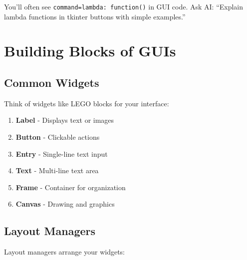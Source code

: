 \documentclass[
  letterpaper,
  DIV=11,
  numbers=noendperiod,
  oneside]{scrreprt}
\providecommand{\tightlist}{%
  \setlength{\itemsep}{0pt}\setlength{\parskip}{0pt}}\usepackage{longtable,booktabs,array}
\begin{document}
\begin{tcolorbox}[enhanced jigsaw, opacityback=0, colback=white, colframe=quarto-callout-warning-color-frame, breakable, titlerule=0mm, coltitle=black, rightrule=.15mm, colbacktitle=quarto-callout-warning-color!10!white, left=2mm, bottomtitle=1mm, bottomrule=.15mm, title=\textcolor{quarto-callout-warning-color}{\faExclamationTriangle}\hspace{0.5em}{Expression Explorer: Lambda Functions}, opacitybacktitle=0.6, toptitle=1mm, leftrule=.75mm, arc=.35mm, toprule=.15mm]

You'll often see \texttt{command=lambda:\ function()} in GUI code. Ask
AI: ``Explain lambda functions in tkinter buttons with simple
examples.''

\end{tcolorbox}

\section{Building Blocks of GUIs}\label{building-blocks-of-guis}

\subsection{Common Widgets}\label{common-widgets}

Think of widgets like LEGO blocks for your interface:

\begin{enumerate}
\def\labelenumi{\arabic{enumi}.}
\tightlist
\item
  \textbf{Label} - Displays text or images
\item
  \textbf{Button} - Clickable actions
\item
  \textbf{Entry} - Single-line text input
\item
  \textbf{Text} - Multi-line text area
\item
  \textbf{Frame} - Container for organization
\item
  \textbf{Canvas} - Drawing and graphics
\end{enumerate}

\subsection{Layout Managers}\label{layout-managers}

Layout managers arrange your widgets:
\end{document}
